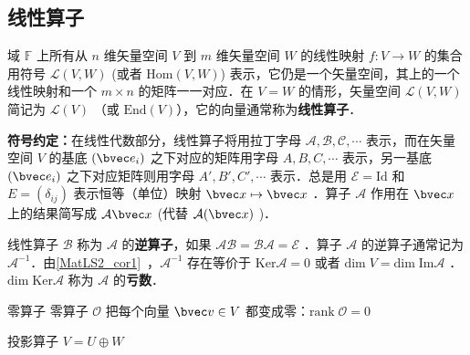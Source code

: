 
\begin{issues}
\issueTODO
\end{issues}

\subsection{线性算子}
域 $\mathbb{F}$ 上所有从 $n$ 维矢量空间 $V$ 到 $m$ 维矢量空间 $W$ 的线性映射 $f:V\rightarrow W$ 的集合用符号 $\mathcal{L}(V,W)$ (或者 $\mathrm{Hom}(V,W)$) 表示，它仍是一个矢量空间，其上的一个线性映射和一个 $m\times n$ 的矩阵一一对应．在 $V=W$ 的情形，矢量空间 $\mathcal{L}(V,W)$ 简记为 $\mathcal{L}(V)$ （或 $\mathrm{End}(V)$），它的向量通常称为\textbf{线性算子}．

\textbf{符号约定：}在线性代数部分，线性算子将用拉丁字母 $\mathcal{A,B,C,\cdots}$ 表示，而在矢量空间 $V$ 的基底 $(\bvec e_i)$ 之下对应的矩阵用字母 $A,B,C,\cdots$ 表示，另一基底 $(\bvec e_i)$ 之下对应矩阵则用字母 $A',B',C',\cdots$ 表示．总是用 $\mathcal{E}=\mathrm{Id}$ 和 $E=(\delta_{ij})$ 表示恒等（单位）映射 $\bvec x\mapsto \bvec x$ ．算子 $\mathcal{A}$ 作用在 $\bvec x$ 上的结果简写成 $\mathcal{A}\bvec x$ (代替 $\mathcal{A}(\bvec x)$ )．

线性算子 $\mathcal{B}$ 称为 $\mathcal{A}$ 的\textbf{逆算子}，如果 $\mathcal{AB}=\mathcal{BA}=\mathcal{E}$ ．算子 $\mathcal{A}$ 的逆算子通常记为 $\mathcal{A}^{-1}$．由\autoref{MatLS2_cor1}~，$\mathcal{A}^{-1}$ 存在等价于 $\mathrm{Ker}\mathcal{A}=0$ 或者 $\mathrm{dim}\;V=\mathrm{dim\;Im}\mathcal{A}$ ．$\mathrm{dim\;Ker}\mathcal{A}$ 称为 $\mathcal{A}$ 的\textbf{亏数}．
\begin{example}{零算子}
零算子 $\mathcal{O}$ 把每个向量 $\bvec v\in V$ 都变成零：$\mathrm{rank}\; \mathcal{O}=0$
\end{example}
\begin{example}{投影算子}
$V=U\oplus W$ 
\end{example}